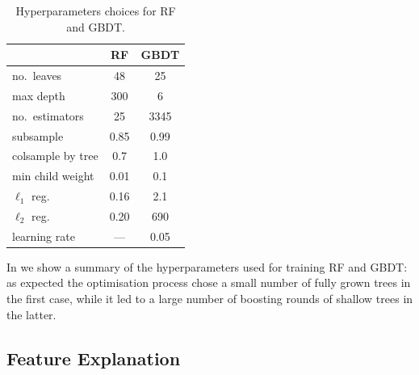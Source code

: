 \begin{table}[htbp]
\centering
\begin{tabular}{@{}lcc@{}}
\toprule
                  & \textbf{RF} & \textbf{GBDT} \\
\midrule
no.\ leaves       & 48          & 25            \\
max depth         & 300         & 6             \\
no.\ estimators   & 25          & 3345          \\
subsample         & 0.85        & 0.99          \\
colsample by tree & 0.7         & 1.0           \\
min child weight  & 0.01        & 0.1           \\
$\ell_1$ reg.     & 0.16        & 2.1           \\
$\ell_2$ reg.     & 0.20        & 690           \\
learning rate     & ---         & 0.05          \\
\bottomrule
\end{tabular}%
\caption{Hyperparameters choices for RF and GBDT.}
\label{tab:ml:hyper}
\end{table}

In  we show a summary of the hyperparameters used for
training RF and GBDT: as expected the optimisation process chose a small number
of fully grown trees in the first case, while it led to a large number of
boosting rounds of shallow trees in the latter.

\subsection{Feature Explanation}\label{sec:ml:shap}


